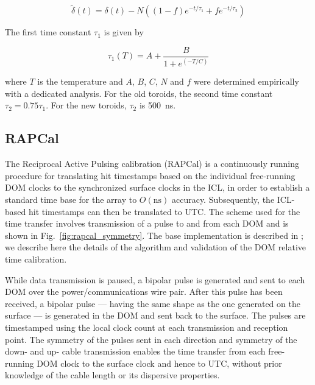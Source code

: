 \begin{equation}
\tilde{\delta}(t) = \delta (t) - N((1 - f) e^{-t/\tau_1} +f
e^{-t/\tau_2})
\end{equation}

\noindent The first time constant $\tau_1$ is given by 

\begin{equation}
\tau_1(T) = A + \frac{B}{1 + e^{(-T/C)}}
\end{equation}

\noindent where $T$ is the temperature and $A$, $B$, $C$, $N$ and $f$ were
determined empirically with a dedicated analysis. For the old toroids, the
second time constant $\tau_2 =0.75\tau_1$. For the new toroids, $\tau_2$ is 500~ns.

\subsection{\label{sect:dom:rapcal}RAPCal}

The Reciprocal Active Pulsing calibration (RAPCal) is a
continuously running procedure for translating hit timestamps based on the 
individual free-running DOM clocks to the synchronized surface clocks in the
ICL, in order to establish a standard time base for the array to
$O(\mathrm{ns})$ accuracy.  Subsequently, the ICL-based hit timestamps can
then be translated to UTC.  The scheme used for the time transfer involves
transmission of a pulse to and from each DOM and is shown in
Fig.~\ref{fig:rapcal_symmetry}.  The base implementation is described in
\cite{ICECUBE:DAQ}; we describe here the details of the 
algorithm and validation of the DOM relative time calibration. 

While data transmission is paused, a bipolar pulse is generated and sent to
each DOM over the power/communications wire pair.  After 
this pulse has been received, a bipolar pulse --- having the same shape
as the one generated on the surface --- is generated in the DOM and sent
back to the surface.  The pulses are timestamped using the local
clock count at each transmission and reception point.  The symmetry of the
pulses sent in each direction and symmetry of the down- and up- cable
transmission enables the time transfer from each free-running DOM clock to the
surface clock and hence to UTC, without prior knowledge of the cable length
or its dispersive properties.

